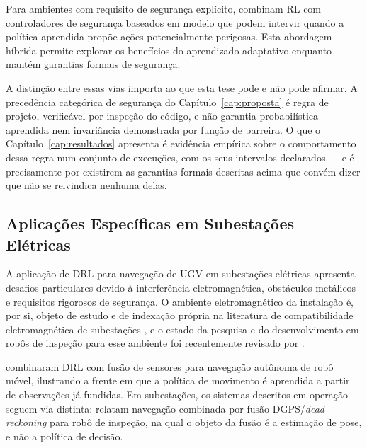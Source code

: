 Para ambientes com requisito de segurança explícito,  combinam \ac{RL} com controladores de segurança baseados em modelo que podem intervir quando a política aprendida propõe ações potencialmente perigosas. Esta abordagem híbrida permite explorar os benefícios do aprendizado adaptativo enquanto mantém garantias formais de segurança.

A distinção entre essas vias importa ao que esta tese pode e não pode afirmar. A
precedência categórica de segurança do Capítulo~\ref{cap:proposta} é regra de projeto,
verificável por inspeção do código, e não garantia probabilística aprendida nem
invariância demonstrada por função de barreira. O que o
Capítulo~\ref{cap:resultados} apresenta é evidência empírica sobre o comportamento dessa
regra num conjunto de execuções, com os seus intervalos declarados --- e é precisamente
por existirem as garantias formais descritas acima que convém dizer que não se
reivindica nenhuma delas.

\subsection{Aplicações Específicas em Subestações Elétricas}

A aplicação de \ac{DRL} para navegação de \ac{UGV} em subestações elétricas apresenta desafios particulares devido à interferência eletromagnética, obstáculos metálicos e requisitos rigorosos de segurança. O ambiente eletromagnético da instalação é, por si, objeto de estudo e de indexação própria na literatura de compatibilidade eletromagnética de subestações \cite{He2007EMCSubstation}, e o estado da pesquisa e do desenvolvimento em robôs de inspeção para esse ambiente foi recentemente revisado por .

 combinaram \ac{DRL} com fusão de sensores para navegação autônoma de robô móvel, ilustrando a frente em que a política de movimento é aprendida a partir de observações já fundidas. Em subestações, os sistemas descritos em operação seguem via distinta:  relatam navegação combinada por fusão DGPS/\textit{dead reckoning} para robô de inspeção, na qual o objeto da fusão é a estimação de pose, e não a política de decisão.

